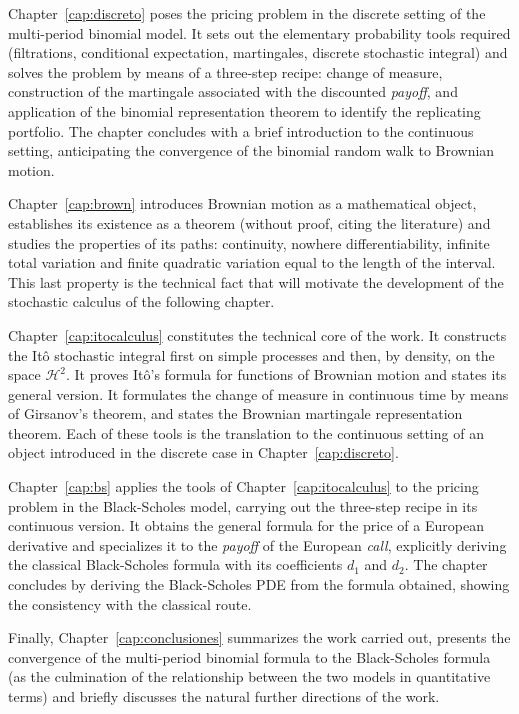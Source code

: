 \documentclass[11pt,a4paper,oneside]{report}
\theoremstyle{plain}
\theoremstyle{definition}
\theoremstyle{remark}
\newcommand{\1}{\mathbf{1}}
\begin{document}
Chapter~\ref{cap:discreto}
poses the pricing problem in the discrete setting of the multi-period
binomial model. It sets out the elementary probability tools
required (filtrations, conditional expectation, martingales, discrete
stochastic integral) and solves the problem by means of a three-step
recipe: change of measure, construction of the martingale associated
with the discounted \emph{payoff}, and application of the binomial
representation theorem to identify the replicating portfolio. The
chapter concludes with a brief introduction to the continuous
setting, anticipating the convergence of the binomial random walk to
Brownian motion.

Chapter~\ref{cap:brown}
introduces Brownian motion as a mathematical object, establishes its
existence as a theorem (without proof, citing the literature) and
studies the properties of its paths: continuity, nowhere
differentiability, infinite total variation and finite quadratic
variation equal to the length of the interval. This last property is
the technical fact that will motivate the development of the
stochastic calculus of the following chapter.

Chapter~\ref{cap:itocalculus} constitutes the technical core of the work. It constructs the Itô
stochastic integral first on simple processes and then, by density,
on the space $\mathcal{H}^2$. It proves Itô's formula for functions of
Brownian motion and states its general version. It formulates the
change of measure in continuous time by means of Girsanov's theorem,
and states the Brownian martingale representation theorem. Each of
these tools is the translation to the continuous setting of an
object introduced in the discrete case in Chapter~\ref{cap:discreto}.

Chapter~\ref{cap:bs}
applies the tools of Chapter~\ref{cap:itocalculus} to the pricing
problem in the Black-Scholes model, carrying out the three-step
recipe in its continuous version. It obtains the general formula for
the price of a European derivative and specializes it to the
\emph{payoff} of the European \emph{call}, explicitly deriving the
classical Black-Scholes formula with its coefficients $d_1$ and
$d_2$. The chapter concludes by deriving the Black-Scholes PDE from
the formula obtained, showing the consistency with the classical
route.

Finally, Chapter~\ref{cap:conclusiones}
summarizes the work carried out, presents the convergence of the
multi-period binomial formula to the Black-Scholes formula (as the
culmination of the relationship between the two models in
quantitative terms) and briefly discusses the natural further
directions of the work.
\end{document}
